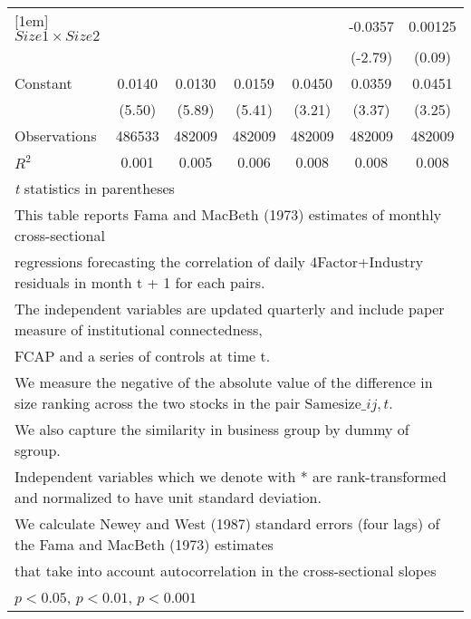 {\begin{tabular}{l*{6}{c}}
[1em]
$ Size1 \times Size2 $&                     &                     &                     &                     &     -0.0357\sym{**} &     0.00125         \\
                    &                     &                     &                     &                     &     (-2.79)         &      (0.09)         \\
[1em]
Constant            &      0.0140\sym{***}&      0.0130\sym{***}&      0.0159\sym{***}&      0.0450\sym{**} &      0.0359\sym{**} &      0.0451\sym{**} \\
                    &      (5.50)         &      (5.89)         &      (5.41)         &      (3.21)         &      (3.37)         &      (3.25)         \\
\hline
Observations        &      486533         &      482009         &      482009         &      482009         &      482009         &      482009         \\
\(R^{2}\)           &       0.001         &       0.005         &       0.006         &       0.008         &       0.008         &       0.008         \\
\hline\hline
\multicolumn{7}{l}{\footnotesize \textit{t} statistics in parentheses}\\
\multicolumn{7}{l}{\footnotesize This table reports Fama and MacBeth (1973) estimates of monthly cross-sectional}\\
\multicolumn{7}{l}{\footnotesize  regressions forecasting the correlation of daily 4Factor+Industry residuals in month t + 1 for each pairs.}\\
\multicolumn{7}{l}{\footnotesize The independent variables are updated quarterly and include paper measure of institutional connectedness,}\\
\multicolumn{7}{l}{\footnotesize  FCAP and a series of controls at time t.}\\
\multicolumn{7}{l}{\footnotesize We measure the negative of the absolute value of the difference in size ranking across the two stocks in the pair $ \text{Samesize}\_{ij,t} $.}\\
\multicolumn{7}{l}{\footnotesize We also capture the similarity in business group by dummy of sgroup.}\\
\multicolumn{7}{l}{\footnotesize Independent variables which  we denote with * are rank-transformed and normalized to have unit standard deviation.}\\
\multicolumn{7}{l}{\footnotesize  We calculate Newey and West (1987) standard errors (four lags) of the Fama and MacBeth (1973) estimates }\\
\multicolumn{7}{l}{\footnotesize  that take into account autocorrelation in the cross-sectional slopes}\\
\multicolumn{7}{l}{\footnotesize \sym{*} \(p<0.05\), \sym{**} \(p<0.01\), \sym{***} \(p<0.001\)}\\
\end{tabular}
}
